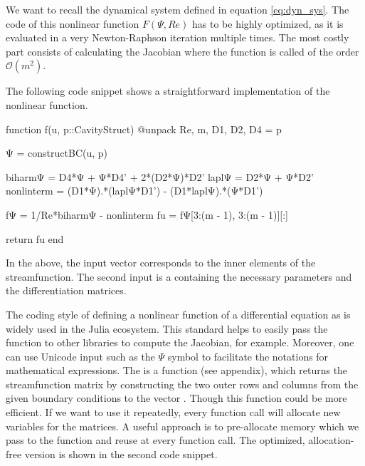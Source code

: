 We want to recall the dynamical system defined in equation \eqref{eq:dyn_sys}.
The code of this nonlinear function $F(\Psi, Re)$ has to be highly optimized,
as it is evaluated in a very Newton-Raphson iteration multiple times. The most
costly part consists of calculating the Jacobian where the function is called
of the order $\mathcal{O}(m^2)$.

The following code snippet shows a straightforward implementation of the
nonlinear function. 

\clearpage

\begin{jllisting}[caption=Simple implementation in Julia of the nonlinear
  function $F$ \vspace{3pt}]
function f(u, p::CavityStruct)
    @unpack Re, m, D1, D2, D4 = p

    Ψ = constructBC(u, p)

    biharmΨ = D4*Ψ +  Ψ*D4' + 2*(D2*Ψ)*D2'
    laplΨ = D2*Ψ + Ψ*D2'
    nonlinterm = (D1*Ψ).*(laplΨ*D1') - (D1*laplΨ).*(Ψ*D1')
    
    fΨ = 1/Re*biharmΨ - nonlinterm
    fu = fΨ[3:(m - 1), 3:(m - 1)][:]

    return fu 
end
\end{jllisting}

In the above, the input vector  corresponds to the inner elements of
the streamfunction. The second input  is a  containing
the necessary parameters and the differentiation matrices. 

The coding style of defining a nonlinear function of a differential equation as
 is widely used in the Julia ecosystem. This standard helps to
easily pass the function to other libraries to compute the Jacobian, for
example. Moreover, one can use Unicode input such as the $\Psi $ symbol to
facilitate the notations for mathematical expressions. The
 is a function (see appendix), which returns the
streamfunction matrix by constructing the two outer rows and columns from the
given boundary conditions to the vector . Though this function could
be more efficient. If we want to use it repeatedly, every function call will
allocate new variables for the matrices. A useful approach is to pre-allocate
memory which we pass to the function and reuse at every function call. The
optimized, allocation-free version is shown in the second code snippet. 

